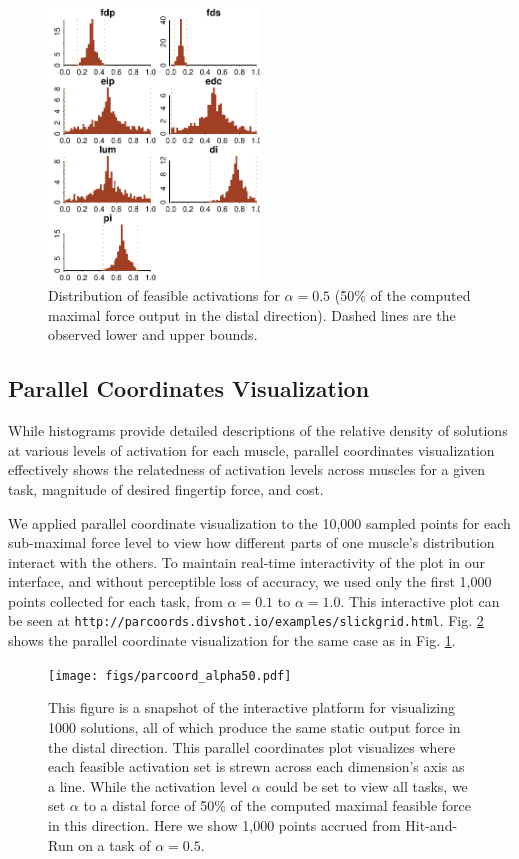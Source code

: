 \begin{figure}[h]
\centering
\includegraphics[width=0.5\textwidth]{figs/raw_histograms.pdf}
\caption{Distribution of feasible activations for $\alpha= 0.5$ (50\% of the computed maximal force output in the distal direction). Dashed lines are the observed lower and upper bounds.}
\label{fig:raw_histograms}
\end{figure}



\subsection*{Parallel Coordinates Visualization}
While histograms provide detailed descriptions of the relative density of solutions at various levels of activation for each muscle,  parallel coordinates visualization  effectively shows the relatedness of activation levels across muscles for a given task, magnitude of desired fingertip force, and cost.

We applied parallel coordinate visualization to the 10,000 sampled points for each sub-maximal force level to view how different parts of one muscle's distribution interact with the others.
To maintain real-time interactivity of the plot in our interface, and without perceptible loss of accuracy, we used only the first 1,000 points collected for each task, from $\alpha = 0.1$ to $\alpha = 1.0$. This interactive plot can be seen at \texttt{http://parcoords.divshot.io/examples/slickgrid.html}. Fig. \ref{fig:parcoord_full} shows the parallel coordinate visualization for the same case as in Fig. \ref{fig:raw_histograms}.

\begin{figure}[htbp]
\centering
\texttt{[image: figs/parcoord\_alpha50.pdf]}
\caption{This figure is a snapshot of the interactive platform for visualizing 1000 solutions, all of which produce the same static output force in the distal direction.
This parallel coordinates plot visualizes where each feasible activation set is strewn across each dimension's axis as a line. 
While the activation level $\alpha$ could be set to view all tasks, we set $\alpha$ to a distal force of 50\% of the computed maximal feasible force in this direction. 
Here we show 1,000 points accrued from Hit-and-Run on a task of $\alpha=0.5$.}
\label{fig:parcoord_full}
\end{figure}

